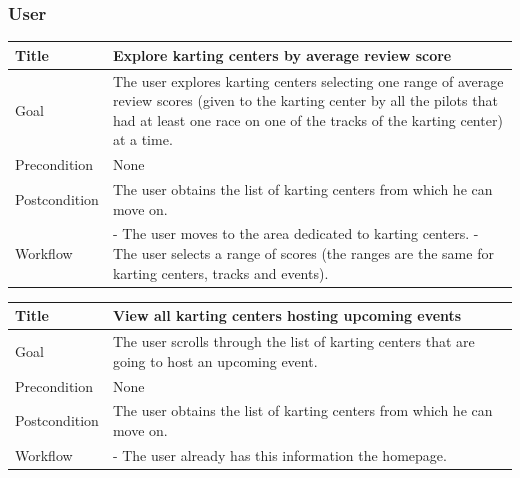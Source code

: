 \documentclass{beamer}
\begin{document}
\begin{frame}
    \frametitle{User}
    \begin{table}
        \tiny
        \begin{tabular}{|p{2cm}|p{6cm}|}
        \hline
        Title & \textbf{Explore karting centers by average review score} \\
        \hline
        Goal & The user explores karting centers selecting one range of average review scores (given to the karting center by all the pilots
        that had at least one race on one of the tracks of the karting center) at a time. \\
        \hline
        Precondition & None \\
        \hline
        Postcondition & The user obtains the list of karting centers from which he can move on.\\
        \hline
        Workflow &
        - The user moves to the area dedicated to karting centers. \newline
        - The user selects a range of scores (the ranges are the same for karting centers, tracks and events). \\
        \hline
        \end{tabular}
\end{table}

\begin{table}
    \tiny
    \begin{tabular}{|p{2cm}|p{6cm}|}
    \hline
    Title & \textbf{View all karting centers hosting upcoming events} \\
    \hline
    Goal & The user scrolls through the list of karting centers that are going to host an upcoming event. \\
    \hline
    Precondition & None \\
    \hline
    Postcondition & The user obtains the list of karting centers from which he can move on.\\
    \hline
    Workflow &
    - The user already has this information the homepage. \\
    \hline
    \end{tabular}
\end{table}
\end{frame}


\end{document}
